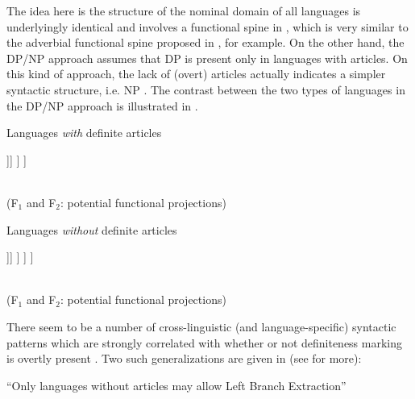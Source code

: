 \documentclass[output=paper,
modfonts
]{langscibook}
\begin{document}
	The idea here is the structure of the nominal domain of all languages is underlyingly identical and involves a functional spine in , which is very similar to the adverbial functional spine proposed in \citet{Cinque1999}, for example.
	On the other hand, the DP/NP approach assumes that DP is present only in languages with articles. On this kind of approach, the lack of (overt) articles actually indicates a simpler syntactic structure, i.e. NP \citep{Baker2003, Boskovic2008, Boskovic2012, Despic2011, Despic2013, Despic2015}. The contrast between the two types of languages in the DP/NP approach is illustrated in .
	
	\ea \label{ex:despic:2} 
	\ea \label{ex:despic:2a} \footnotesize
	{\normalsize Languages \textit{with} definite articles} \\ \largerpage[3]
	\begin{forest}
		[\textbf{DP}
		[\textbf{D}\\\textit{\textbf{the}}]
		[FP$_{1}$
		[F$_{1}$
		] 
		[FP$_{2}$[F$_{2}$
		][NP[{},roof]]]
		]
		]
	\end{forest}
	\\ \vspace{-5pt} (F$_1$ and F$_2$: potential functional projections)
	
	\newpage 
	\ex \label{ex:despic:2b}\footnotesize {\normalsize Languages \textit{without} definite articles} \\
	\begin{forest}
		[\textit{(DP projection absent)}%
		[\textbf{}%
		]
		[FP$_{1}$
		[F$_{1}$%
		] %
		[FP$_{2}$[F$_{2}$%
		][NP[{},roof]]]
		]
		]
		]
	\end{forest}
	\\ \vspace{-5pt} (F$_1$ and F$_2$: potential functional projections)
	\z
	\z
	
	There seem to be a number of cross-linguistic (and language-specific) syntactic patterns which are strongly correlated with whether or not definiteness marking is overtly present \citep[e.g.][]{Boskovic2008}. Two such generalizations are given in  (see \citealt{Boskovic2008} for more):
	
	\ea \label{ex:despic:3}
	\ea 
	``Only languages without articles may allow Left Branch Extraction''
	\citep{Boskovic2008,Boskovic2012}
	\label{ex:despic:3a}
	
\end{document}
